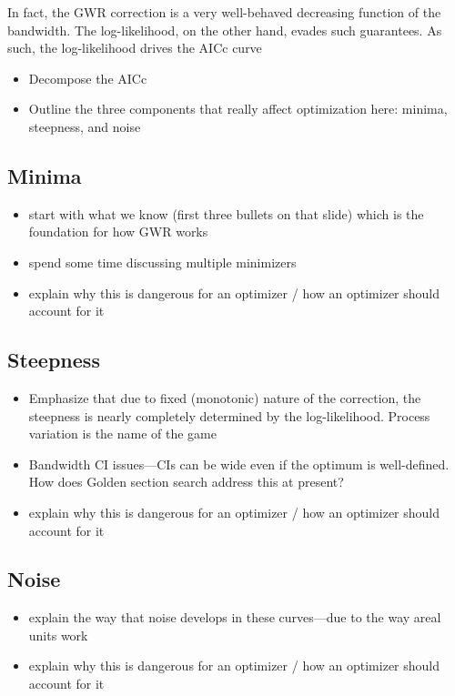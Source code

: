 \documentclass[letterpaper,12pt,twocolumn]{article}
\begin{document}
In fact, the GWR correction is a very well-behaved decreasing function of the bandwidth. The log-likelihood, on the other hand, evades such guarantees. As such, the log-likelihood drives the AICc curve

\begin{itemize}
    \item Decompose the AICc
    \item Outline the three components that really affect optimization here: minima, steepness, and noise
\end{itemize}

\subsection{Minima}
\begin{itemize}
    \item start with what we know (first three bullets on that slide) which is the foundation for how GWR works
    \item spend some time discussing multiple minimizers
    \item explain why this is dangerous for an optimizer / how an optimizer should account for it
\end{itemize}

\subsection{Steepness}
\begin{itemize}
    \item Emphasize that due to fixed (monotonic) nature of the correction, the steepness is nearly completely determined by the log-likelihood. Process variation is the name of the game
    \item Bandwidth CI issues---CIs can be wide even if the optimum is well-defined. How does Golden section search address this at present?
    \item explain why this is dangerous for an optimizer / how an optimizer should account for it   
\end{itemize}

\subsection{Noise}
\begin{itemize}
    \item explain the way that noise develops in these curves---due to the way areal units work
    \item explain why this is dangerous for an optimizer / how an optimizer should account for it
\end{itemize}
\end{document}
